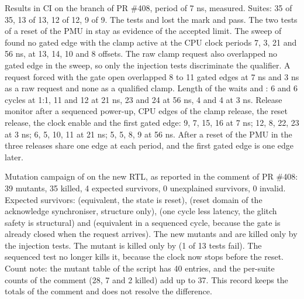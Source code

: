 \begin{record}

Results in CI on the branch of PR \#408, period of  7 ns, measured. Suites:  35 of 35,  13 of 13,  12 of 12,  9 of 9. The tests  and  lost the mark  and pass. The two  tests of a reset of the PMU in  stay  as evidence of the accepted limit. The sweep of  found no gated edge with the clamp active at the CPU clock periods 7, 3, 21 and 56 ns, at 13, 14, 10 and 8 offsets. The raw clamp request also overlapped no gated edge in the sweep, so only the injection tests discriminate the qualifier. A request forced with the gate open overlapped 8 to 11 gated edges at 7 ns and 3 ns as a raw request and none as a qualified clamp. Length of the waits  and : 6 and 6 cycles at 1:1, 11 and 12 at 21 ns, 23 and 24 at 56 ns, 4 and 4 at 3 ns. Release monitor after a sequenced power-up, CPU edges of the clamp release, the reset release, the clock enable and the first gated edge: 9, 7, 15, 16 at 7 ns; 12, 8, 22, 23 at 3 ns; 6, 5, 10, 11 at 21 ns; 5, 5, 8, 9 at 56 ns. After a reset of the PMU in  the three releases share one edge at each period, and the first gated edge is one edge later.

\end{record}

\begin{record}

Mutation campaign of  on the new RTL, as reported in the comment of PR \#408: 39 mutants, 35 killed, 4 expected survivors, 0 unexplained survivors, 0 invalid. Expected survivors:  (equivalent, the state is reset),  (reset domain of the acknowledge synchroniser, structure only),  (one cycle less latency, the glitch safety is structural) and  (equivalent in a sequenced cycle, because the gate is already closed when the request arrives). The new mutants  and  are killed only by the injection tests. The mutant  is killed only by  (1 of 13 tests fail). The sequenced test no longer kills it, because the clock now stops before the reset. Count note: the mutant table of the script has 40 entries, and the per-suite counts of the comment (28, 7 and 2 killed) add up to 37. This record keeps the totals of the comment and does not resolve the difference.

\end{record}

